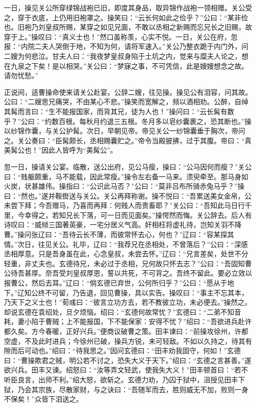 一日，操见关公所穿绿锦战袍已旧，即度其身品，取异锦作战袍一领相赠。关公受之，穿于衣底，上仍用旧袍罩之。操笑曰：“云长何如此之俭乎？”公曰：“某非俭也。旧袍乃刘皇叔所赐，某穿之如见兄面，不敢以丞相之新赐而忘兄长之旧赐，故穿于上。”操叹曰：“真义士也！”然口虽称羡，心实不悦。一日，关公在府，忽报：“内院二夫人哭倒于地，不知为何，请将军速入。”关公乃整衣跪于内门外，问二嫂为何悲泣。甘夫人曰：“我夜梦皇叔身陷于土坑之内，觉来与糜夫人论之，想在九泉之下矣！是以相哭。”关公曰：“梦寐之事，不可凭信，此是嫂嫂想念之故。请勿忧愁。”

正说间，适曹操命使来请关公赴宴。公辞二嫂，往见操。操见公有泪容，问其故。公曰：“二嫂思兄痛哭，不由某心不悲。”操笑而宽解之，频以酒相劝。公醉，自绰其髯而言曰：“生不能报国家，而背其兄，徒为人也！”操问曰：“云长髯有数乎？”公曰：“约数百根。每秋月约退三五根。冬月多以皂纱囊裹之，恐其断也。”操以纱锦作囊，与关公护髯。次日，早朝见帝。帝见关公一纱锦囊垂于胸次，帝问之。关公奏曰：“臣髯颇长，丞相赐囊贮之。”帝令当殿披拂，过于其腹。帝曰：“真美髯公也！”因此人皆呼为“美髯公”。

忽一日，操请关公宴。临散，送公出府，见公马瘦，操曰：“公马因何而瘦？”关公曰：“贱躯颇重，马不能载，因此常瘦。”操令左右备一马来。须臾牵至。那马身如火炭，状甚雄伟。操指曰：“公识此马否？”公曰：“莫非吕布所骑赤兔马乎？”操曰：“然也。”遂并鞍辔送与关公。关公再拜称谢。操不悦曰：“吾累送美女金帛，公未尝下拜；今吾赠马，乃喜而再拜：何贱人而贵畜耶？”关公曰：“吾知此马日行千里，今幸得之，若知兄长下落，可一日而见面矣。”操愕然而悔。关公辞去。后人有诗叹曰：“威倾三国著英豪，一宅分居义气高。奸相枉将虚礼待，岂知关羽不降曹。”操问张辽曰：“吾待云长不薄，而彼常怀去心，何也？”辽曰：“容某探其情。”次日，往见关公。礼毕，辽曰：“我荐兄在丞相处，不曾落后？”公曰：“深感丞相厚意。只是吾身虽在此，心念皇叔，未尝去怀。”辽曰：“兄言差矣，处世不分轻重，非丈夫也。玄德待兄，未必过于丞相，兄何故只怀去志？”公曰：“吾固知曹公待吾甚厚。奈吾受刘皇叔厚恩，誓以共死，不可背之。吾终不留此。要必立效以报曹公，然后去耳。”辽曰：“倘玄德已弃世，公何所归乎？”公曰：“愿从于地下。”辽知公终不可留，乃告退，回见曹操，具以实告。操叹曰：“事主不忘其本，乃天下之义士也！”荀彧曰：“彼言立功方去，若不教彼立功，未必便去。”操然之。却说玄德在袁绍处，旦夕烦恼。绍曰：“玄德何故常忧？”玄德曰：“二弟不知音耗，妻小陷于曹贼；上不能报国，下不能保家：安得不忧？”绍曰：“吾欲进兵赴许都久矣。方今春暖，正好兴兵。”便商议破曹之策。田丰谏曰：“前操攻徐州，许都空虚，不及此时进兵；今徐州已破，操兵方锐，未可轻敌。不如以久持之，待其有隙而后可动也。”绍曰：“待我思之。”因问玄德曰：“田丰劝我固守，何如！”玄德曰：“曹操欺君之贼，明公若不讨之，恐失大义于天下。”绍曰：“玄德之言甚善。”遂欲兴兵。田丰又谏。绍怒曰：“汝等弄文轻武，使我失大义！”田丰顿首曰：“若不听臣良言，出师不利。”绍大怒，欲斩之。玄德力劝，乃囚于狱中，沮授见田丰下狱，乃会其宗族，尽散家财，与之诀曰：“吾随军而去，胜则威无不加，败则一身不保矣！”众皆下泪送之。

